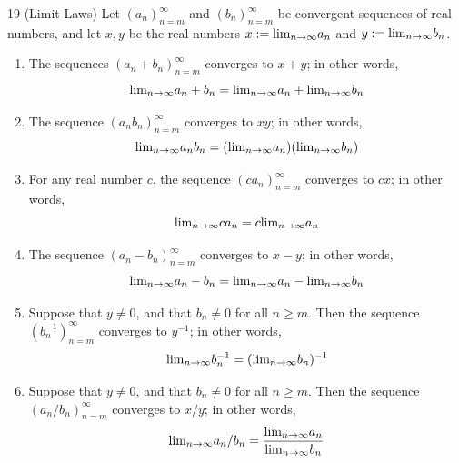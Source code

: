 \begin{theorem}{19}
    \label{limit-laws}
    (Limit Laws) Let $(a_n)_{n=m}^{\infty}$ and $(b_n)_{n=m}^{\infty}$ be convergent
    sequences of real numbers, and let $x, y$ be the real numbers $x := \text{lim}_{n \rightarrow \infty}{a_n}$
    and $y:= \text{lim}_{n \rightarrow \infty}{b_n}$.
    \begin{enumerate}
        \item The sequences $(a_n + b_n)_{n=m}^{\infty}$ converges to $x + y$; in other
        words,
        \begin{equation*}
            \text{lim}_{n \rightarrow \infty}{a_n + b_n} = \text{lim}_{n \rightarrow \infty}{a_n} + \text{lim}_{n \rightarrow \infty}{b_n}
        \end{equation*}
        \item The sequence $(a_n b_n)_{n=m}^{\infty}$ converges to $xy$; in other
        words,
        \begin{equation*}
            \text{lim}_{n \rightarrow \infty}{a_n b_n} = (\text{lim}_{n \rightarrow \infty}{a_n})(\text{lim}_{n \rightarrow \infty}{b_n})
        \end{equation*}
        \item For any real number $c$, the sequence $(ca_n)_{n=m}^{\infty}$ converges
        to $cx$; in other words,
        \begin{equation*}
            \text{lim}_{n \rightarrow \infty}{ca_n} = c\text{lim}_{n \rightarrow \infty}{a_n}
        \end{equation*}
        \item The sequence $(a_n - b_n)_{n=m}^{\infty}$ converges to $x - y$;
        in other words,
        \begin{equation*}
            \text{lim}_{n \rightarrow \infty}{a_n - b_n} = \text{lim}_{n \rightarrow \infty}{a_n} - \text{lim}_{n \rightarrow \infty}{b_n}
        \end{equation*}
        \item Suppose that $y \neq 0$, and that $b_n \neq 0$ for all $n \geq m$.
        Then the sequence $(b^{-1}_n)_{n=m}^{\infty}$ converges to $y^{-1}$; in
        other words,
        \begin{equation*}
            \text{lim}_{n \rightarrow \infty}{b^{-1}_n} = (\text{lim}_{n \rightarrow \infty}{b_n})^{-1}
        \end{equation*}
        \item Suppose that $y \neq 0$, and that $b_n \neq 0$ for all $n \geq m$.
        Then the sequence $(a_n / b_n)_{n=m}^{\infty}$ converges to $x/y$; in other
        words,
        \begin{equation*}
            \limit{a_n / b_n} = \frac{\limit{a_n}}{\limit{b_n}}

\end{equation*}
\end{enumerate}
\end{theorem}
